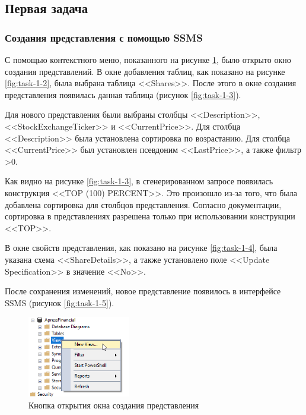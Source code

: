 \documentclass[a4paper, 14pt]{extarticle}
\begin{document}
\subsection{Первая задача}

\subsubsection{Создания представления с помощью SSMS}

С помощью контекстного меню, показанного на рисунке \ref{fig:task-1-1}, было
открыто окно создания представлений. В окне добавления таблиц, как показано на
рисунке \ref{fig:task-1-2}, была выбрана таблица
<<\foreignlanguage{english}{Shares}>>. После этого в окне создания представления
появилась данная таблица (рисунок \ref{fig:task-1-3}).

Для нового представления были выбраны столбцы
<<\foreignlanguage{english}{Description}>>,
<<\foreignlanguage{english}{StockExchangeTicker}>> и
<<\foreignlanguage{english}{CurrentPrice}>>. Для столбца
<<\foreignlanguage{english}{Description}>> была установлена сортировка по
возрастанию. Для столбца <<\foreignlanguage{english}{CurrentPrice}>> был
установлен псевдоним \foreignlanguage{english}{<<LastPrice>>}, а также
фильтр >0.

Как видно на рисунке \ref{fig:task-1-3}, в сгенерированном запросе появилась
конструкция <<\foreignlanguage{english}{TOP (100) PERCENT}>>. Это произошло из-за
того, что была добавлена сортировка для столбцов представления. Согласно
документации, сортировка в представлениях разрешена только при использовании
конструкции <<\foreignlanguage{english}{TOP}>>.

В окне свойств представления, как показано на рисунке \ref{fig:task-1-4}, была
указана схема <<\foreignlanguage{english}{ShareDetails}>>, а также установлено
поле <<\foreignlanguage{english}{Update Specification}>> в значение
<<\foreignlanguage{english}{No}>>.

После сохранения изменений, новое представление появилось в интерфейсе SSMS
(рисунок \ref{fig:task-1-5}).

\begin{figure}[H]
  \centering
  \includegraphics[width=0.4\textwidth]{images/task-1/1.png}
  \caption{Кнопка открытия окна создания представления}
  \label{fig:task-1-1}
\end{figure}
\end{document}

